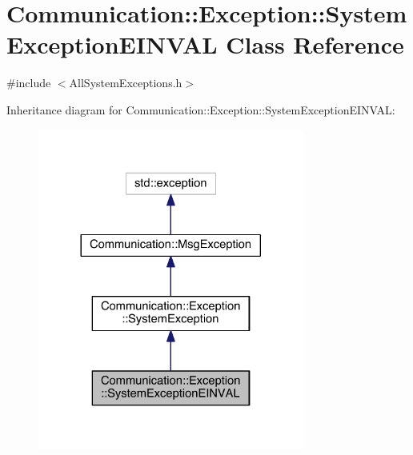 \hypertarget{class_communication_1_1_exception_1_1_system_exception_e_i_n_v_a_l}{}\section{Communication\+:\+:Exception\+:\+:System\+Exception\+E\+I\+N\+V\+A\+L Class Reference}
\label{class_communication_1_1_exception_1_1_system_exception_e_i_n_v_a_l}


{\ttfamily \#include $<$All\+System\+Exceptions.\+h$>$}



Inheritance diagram for Communication\+:\+:Exception\+:\+:System\+Exception\+E\+I\+N\+V\+A\+L\+:\nopagebreak
\begin{figure}[H]
\begin{center}
\leavevmode
\includegraphics[width=248pt]{class_communication_1_1_exception_1_1_system_exception_e_i_n_v_a_l__inherit__graph}
\end{center}
\end{figure}


